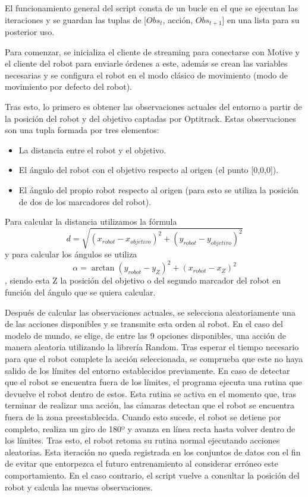 El funcionamiento general del \gls{script} consta de un bucle en el que se ejecutan las iteraciones y se guardan las tuplas de [\( Obs_t \), acción, \( Obs_{t+1} \)] en una lista para su posterior 
uso. 

Para comenzar, se inicializa el cliente de streaming para conectarse con Motive y el cliente del robot para enviarle órdenes a este, además se crean las variables necesarias y se configura el 
robot en el modo clásico de movimiento (modo de movimiento por defecto del robot).

Tras esto, lo primero es obtener las observaciones actuales del entorno a partir de la posición del robot y del objetivo captadas por Optitrack. Estas observaciones son una tupla formada por 
tres elementos:

\begin{itemize}
  \item La distancia entre el robot y el objetivo.
  \item El ángulo del robot con el objetivo respecto al origen (el punto [0,0,0]).
  \item El ángulo del propio robot respecto al origen (para esto se utiliza la posición de dos de los marcadores del robot).
\end{itemize} 

Para calcular la distancia utilizamos la fórmula 
\[
d = \sqrt{(x_{robot} - x_{objetivo})^2 + (y_{robot} - y_{objetivo})^2}
\]
y para calcular los ángulos se utiliza 
\[
\alpha = \arctan{(y_{robot} - y_{Z})^2 + (x_{robot} - x_{Z})^2}
\]
, siendo esta Z la posición del objetivo o del segundo marcador del robot en función del ángulo que se quiera calcular. 

Después de calcular las observaciones actuales, se selecciona aleatoriamente una de las acciones disponibles y se transmite esta orden al robot. En el caso del modelo de mundo, se elige, de 
entre las 9 opciones disponibles, una acción de manera aleatoria utilizando la librería Random. Tras esperar el tiempo necesario para que el robot complete la acción seleccionada, se comprueba 
que este no haya salido de los límites del entorno establecidos previamente. En caso de detectar que el robot se encuentra fuera de los límites, el programa ejecuta una rutina que devuelve el 
robot dentro de estos. Esta rutina se activa en el momento que, tras terminar de realizar una acción, las cámaras detectan que el robot se encuentra fuera de la zona preestablecida. Cuando esto 
sucede, el robot se detiene por completo, realiza un giro de 180º y avanza en línea recta hasta volver dentro de los límites. Tras esto, el robot retoma su rutina normal ejecutando acciones 
aleatorias. Esta iteración no queda registrada en los conjuntos de datos con el fin de evitar que entorpezca el futuro entrenamiento al considerar erróneo este comportamiento. En el caso 
contrario, el \gls{script} vuelve a consultar la posición del robot y calcula las nuevas observaciones.

